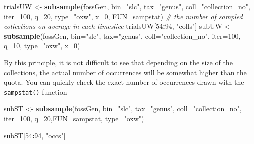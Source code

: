 \documentclass[]{article}
\newenvironment{Shaded}{\begin{snugshade}}{\end{snugshade}}
\newcommand{\CommentTok}[1]{\textcolor[rgb]{0.56,0.35,0.01}{\textit{#1}}}
\newcommand{\DataTypeTok}[1]{\textcolor[rgb]{0.13,0.29,0.53}{#1}}
\newcommand{\DecValTok}[1]{\textcolor[rgb]{0.00,0.00,0.81}{#1}}
\newcommand{\KeywordTok}[1]{\textcolor[rgb]{0.13,0.29,0.53}{\textbf{#1}}}
\newcommand{\NormalTok}[1]{#1}
\newcommand{\OperatorTok}[1]{\textcolor[rgb]{0.81,0.36,0.00}{\textbf{#1}}}
\newcommand{\StringTok}[1]{\textcolor[rgb]{0.31,0.60,0.02}{#1}}
\begin{document}
\begin{Shaded}
\begin{Highlighting}[]
\NormalTok{trialsUW <-}\StringTok{ }\KeywordTok{subsample}\NormalTok{(fossGen, }\DataTypeTok{bin=}\StringTok{"slc"}\NormalTok{, }\DataTypeTok{tax=}\StringTok{"genus"}\NormalTok{, }\DataTypeTok{coll=}\StringTok{"collection_no"}\NormalTok{,}
  \DataTypeTok{iter=}\DecValTok{100}\NormalTok{, }\DataTypeTok{q=}\DecValTok{20}\NormalTok{, }\DataTypeTok{type=}\StringTok{"oxw"}\NormalTok{, }\DataTypeTok{x=}\DecValTok{0}\NormalTok{, }\DataTypeTok{FUN=}\NormalTok{sampstat)}
\CommentTok{# the number of sampled collections on average in each timeslice}
\NormalTok{trialsUW[}\DecValTok{54}\OperatorTok{:}\DecValTok{94}\NormalTok{, }\StringTok{"colls"}\NormalTok{]}
\NormalTok{subUW <-}\StringTok{ }\KeywordTok{subsample}\NormalTok{(fossGen, }\DataTypeTok{bin=}\StringTok{"slc"}\NormalTok{, }\DataTypeTok{tax=}\StringTok{"genus"}\NormalTok{, }\DataTypeTok{coll=}\StringTok{"collection_no"}\NormalTok{,}
  \DataTypeTok{iter=}\DecValTok{100}\NormalTok{, }\DataTypeTok{q=}\DecValTok{10}\NormalTok{, }\DataTypeTok{type=}\StringTok{"oxw"}\NormalTok{, }\DataTypeTok{x=}\DecValTok{0}\NormalTok{)}
\end{Highlighting}
\end{Shaded}

By this principle, it is not difficult to see that depending on the size
of the collections, the actual number of occurrences will be somewhat
higher than the quota. You can quickly check the exact number of
occurrences drawn with the \texttt{sampstat()} function

\begin{Shaded}
\begin{Highlighting}[]
\NormalTok{subST <-}\StringTok{ }\KeywordTok{subsample}\NormalTok{(fossGen, }\DataTypeTok{bin=}\StringTok{"slc"}\NormalTok{, }\DataTypeTok{tax=}\StringTok{"genus"}\NormalTok{, }\DataTypeTok{coll=}\StringTok{"collection_no"}\NormalTok{, }
  \DataTypeTok{iter=}\DecValTok{100}\NormalTok{, }\DataTypeTok{q=}\DecValTok{20}\NormalTok{,}\DataTypeTok{FUN=}\NormalTok{sampstat, }\DataTypeTok{type=}\StringTok{"oxw"}\NormalTok{)}
\end{Highlighting}
\end{Shaded}

\begin{Shaded}
\begin{Highlighting}[]
\NormalTok{subST[}\DecValTok{54}\OperatorTok{:}\DecValTok{94}\NormalTok{, }\StringTok{"occs"}\NormalTok{]}
\end{Highlighting}
\end{Shaded}
\end{document}
